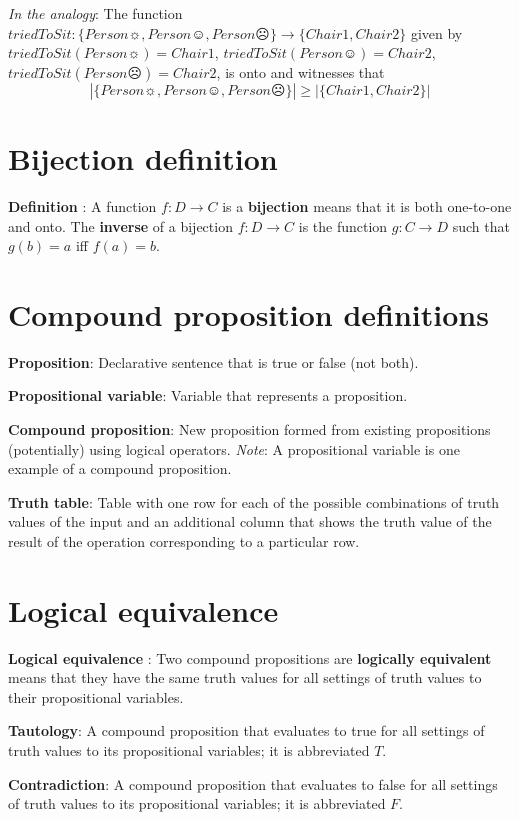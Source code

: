 \documentclass[12pt, oneside]{article}
\begin{document}
{\it In the analogy}: The function $triedToSit: \{ Person\sun, Person\smiley, Person\frownie \} \to  \{ Chair1, Chair2\} $ given
by $triedToSit(Person\sun) = Chair1$,  $triedToSit(Person\smiley) = Chair2$, 
$triedToSit(Person\frownie) = Chair2$, is onto and witnesses that 
\[
 |\{ Person\sun, Person\smiley, Person\frownie \}| \geq | \{ Chair1, Chair2\} |
\] \vfill
\section*{Bijection definition}


{\bf Definition} : A function $f: D  \to C$ is a {\bf bijection} means that it is both 
one-to-one  and onto. The {\bf inverse} of a  bijection $f: D  \to  C$ is 
the function $g: C  \to  D$  such that $g(b) = a$ iff  $f(a) =  b$.
 \vfill
\section*{Compound proposition definitions}


{\bf Proposition}: Declarative sentence that is true or false (not both).

{\bf Propositional variable}: Variable that represents a proposition.

{\bf Compound proposition}: New proposition formed from existing propositions (potentially) using logical operators.
{\it Note}: A propositional variable is one example of a compound proposition.

{\bf Truth table}: Table with one row for each of the possible combinations of truth values of the input and 
    an additional column that shows the truth value of the result of the operation corresponding to a particular row.
    
 \vfill
\section*{Logical equivalence}


{\bf Logical equivalence }: Two compound  propositions are {\bf logically  equivalent} means that  they 
have the  same  truth  values for all settings of truth  values to their propositional  variables.

{\bf Tautology}:  A compound proposition that evaluates to true
for all settings of truth  values to its propositional  variables; it is  abbreviated $T$.

{\bf Contradiction}: A compound proposition that  evaluates  to  false 
for  all settings of truth  values to its propositional  variables; it  is abbreviated $F$.
\end{document}
